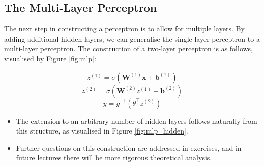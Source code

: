 \subsection{The Multi-Layer Perceptron}

The next step in constructing a perceptron is to allow for multiple layers. By adding additional hidden layers, we can generalise the single-layer perceptron to a multi-layer perceptron. The construction of a two-layer perceptron is as follows, visualised by Figure \ref{fig:mlp}:

\[
    z^{(1)} = \sigma (\bm{W}^{(1)} \bm{x} + \bm{b}^{(1)})
\]
\[
    z^{(2)} = \sigma (\bm{W}^{(2)} z^{(1)} + \bm{b}^{(2)})
\]
\[
    y = g^{-1} \left( \theta^\top z^{(2)} \right)
\]


\begin{itemize}
    \item The extension to an arbitrary number of hidden layers follows naturally from this structure, as visualised in Figure \ref{fig:mlp_hidden}.
    \item Further questions on this construction are addressed in exercises, and in future lectures there will be more rigorous theoretical analysis.
\end{itemize}


